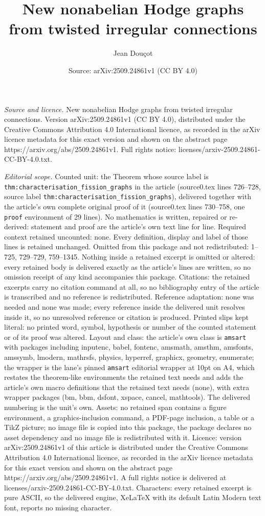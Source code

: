 \documentclass[10pt,a4paper]{amsart}
\title[New nonabelian Hodge graphs from twisted irregular connectio]{New nonabelian Hodge graphs from twisted irregular connections}
\author{Jean Dou\c{c}ot}
\date{Source: arXiv:2509.24861v1 (CC BY 4.0)}
\begin{document}
\maketitle

\noindent\emph{Source and licence.} New nonabelian Hodge graphs from twisted irregular connections. Version arXiv:2509.24861v1 (CC BY 4.0), distributed under the Creative Commons Attribution 4.0 International licence, as recorded in the arXiv licence metadata for this exact version and shown on the abstract page https://arxiv.org/abs/2509.24861v1. Full rights notice: licenses/arxiv-2509.24861-CC-BY-4.0.txt.\par\smallskip

\noindent\textit{Editorial scope.} Counted unit: the Theorem whose source label is \texttt{thm:characterisation\_fission\_graphs} in the article (source0.tex lines 726--728, source label \texttt{thm:characterisation\_fission\_graphs}), delivered together with the article's own complete original proof of it (source0.tex lines 730--758, one \texttt{proof} environment of 29 lines). No mathematics is written, repaired or re-derived: statement and proof are the article's own text line for line. Required context retained uncounted: none. Every definition, display and label of those lines is retained unchanged. Omitted from this package and not redistributed: 1--725, 729--729, 759--1345. Nothing inside a retained excerpt is omitted or altered: every retained body is delivered exactly as the article's lines are written, so no omission receipt of any kind accompanies this package. Citations: the retained excerpts carry no citation command at all, so no bibliography entry of the article is transcribed and no reference is redistributed. Reference adaptation: none was needed and none was made; every reference inside the delivered unit resolves inside it, so no unresolved reference or citation is produced. Printed slips kept literal: no printed word, symbol, hypothesis or number of the counted statement or of its proof was altered. Layout and class: the article's own class is \texttt{amsart} with packages including inputenc, babel, fontenc, amsmath, amsthm, amsfonts, amssymb, lmodern, mathrsfs, physics, hyperref, graphicx, geometry, enumerate; the wrapper is the lane's pinned \texttt{amsart} editorial wrapper at 10pt on A4, which restates the theorem-like environments the retained text needs and adds the article's own macro definitions that the retained text needs (none), with extra wrapper packages (bm, bbm, dsfont, xspace, cancel, mathtools). The delivered numbering is the unit's own. Assets: no retained span contains a figure environment, a graphics-inclusion command, a PDF-page inclusion, a table or a TikZ picture; no image file is copied into this package, the package declares no asset dependency and no image file is redistributed with it. Licence: version arXiv:2509.24861v1 of this article is distributed under the Creative Commons Attribution 4.0 International licence, as recorded in the arXiv licence metadata for this exact version and shown on the abstract page https://arxiv.org/abs/2509.24861v1. A full rights notice is delivered at licenses/arxiv-2509.24861-CC-BY-4.0.txt. Characters: every retained excerpt is pure ASCII, so the delivered engine, XeLaTeX with its default Latin Modern text font, reports no missing character.
\end{document}
